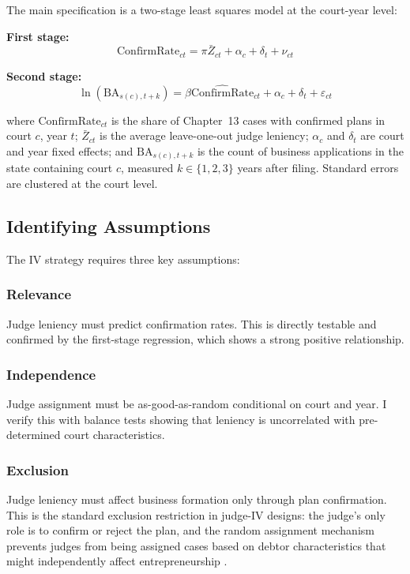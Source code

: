 \documentclass[12pt]{article}
\begin{document}
The main specification is a two-stage least squares model at the court-year level:

\textbf{First stage:}
\begin{equation}
\text{ConfirmRate}_{ct} = \pi \bar{Z}_{ct} + \alpha_c + \delta_t + \nu_{ct}
\label{eq:first_stage}
\end{equation}

\textbf{Second stage:}
\begin{equation}
\ln(\text{BA}_{s(c),t+k}) = \beta \widehat{\text{ConfirmRate}}_{ct} + \alpha_c + \delta_t + \varepsilon_{ct}
\label{eq:second_stage}
\end{equation}

where $\text{ConfirmRate}_{ct}$ is the share of Chapter~13 cases with confirmed plans in court $c$, year $t$; $\bar{Z}_{ct}$ is the average leave-one-out judge leniency; $\alpha_c$ and $\delta_t$ are court and year fixed effects; and $\text{BA}_{s(c),t+k}$ is the count of business applications in the state containing court $c$, measured $k \in \{1,2,3\}$ years after filing. Standard errors are clustered at the court level.

\subsection{Identifying Assumptions}

The IV strategy requires three key assumptions:

\subsubsection*{Relevance} Judge leniency must predict confirmation rates. This is directly testable and confirmed by the first-stage regression, which shows a strong positive relationship.

\subsubsection*{Independence} Judge assignment must be as-good-as-random conditional on court and year. I verify this with balance tests showing that leniency is uncorrelated with pre-determined court characteristics.

\subsubsection*{Exclusion} Judge leniency must affect business formation only through plan confirmation. This is the standard exclusion restriction in judge-IV designs: the judge's only role is to confirm or reject the plan, and the random assignment mechanism prevents judges from being assigned cases based on debtor characteristics that might independently affect entrepreneurship \citep{frandsen2023}.
\end{document}
